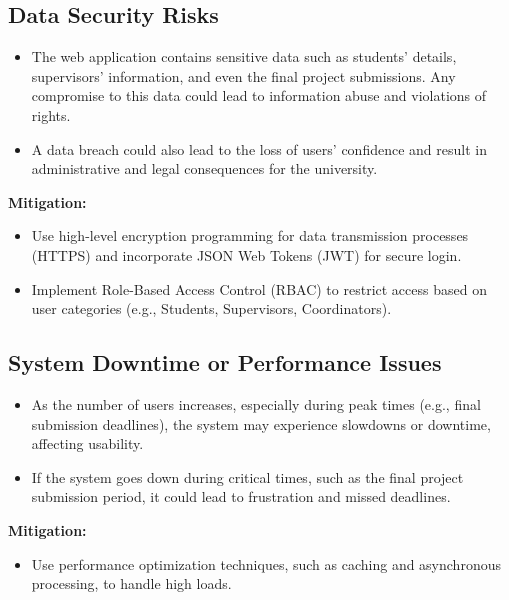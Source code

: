 \documentclass{FastFyp}
\begin{document}
\subsection{Data Security Risks}
\begin{itemize}
    \item The web application contains sensitive data such as students’ details, supervisors’ information, and even the final project submissions. Any compromise to this data could lead to information abuse and violations of rights.
    \item A data breach could also lead to the loss of users’ confidence and result in administrative and legal consequences for the university.
\end{itemize}
\textbf{Mitigation:}
\begin{itemize}
    \item Use high-level encryption programming for data transmission processes (HTTPS) and incorporate JSON Web Tokens (JWT) for secure login.
    \item Implement Role-Based Access Control (RBAC) to restrict access based on user categories (e.g., Students, Supervisors, Coordinators).
\end{itemize}

\subsection{System Downtime or Performance Issues}
\begin{itemize}
    \item As the number of users increases, especially during peak times (e.g., final submission deadlines), the system may experience slowdowns or downtime, affecting usability.
    \item If the system goes down during critical times, such as the final project submission period, it could lead to frustration and missed deadlines.
\end{itemize}
\textbf{Mitigation:}
\begin{itemize}
    \item Use performance optimization techniques, such as caching and asynchronous processing, to handle high loads.
\end{itemize}
\end{document}
